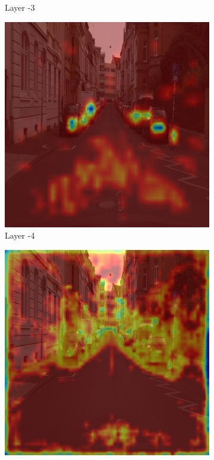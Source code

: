 \begin{figure}
\begin{subfigure}[b]{0.49\textwidth}
        \caption{Layer -3}
        \label{fig:c-3}
    \end{subfigure}
    \hfill
    \begin{subfigure}[b]{0.49\textwidth}
        \centering
        \includegraphics[width=\textwidth]{figures/bonn_000037_000019_leftImg8bit.pnglayer-4/bonn_000037_000019_leftImg8bit.png_object(0)_heatmap}
        \caption{Layer -4}
        \label{fig:c-4}
    \end{subfigure}
    \hfill
    \begin{subfigure}[b]{0.49\textwidth}
        \centering
        \includegraphics[width=\textwidth]{figures/bonn_000037_000019_leftImg8bit.pnglayer-5/bonn_000037_000019_leftImg8bit.png_object(0)_heatmap}

\end{subfigure}
\end{figure}
